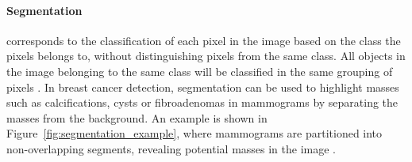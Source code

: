 \paragraph{Segmentation} corresponds to the classification of each pixel in the image based on the class the pixels belongs to, without distinguishing pixels from the same class. All objects in the image belonging to the same class will be classified in the same grouping of pixels \citep{Geron2019}. In breast cancer detection, segmentation can be used to highlight masses such as calcifications, cysts or fibroadenomas \citep{breastcancerorg2018} in mammograms by separating the masses from the background. An example is shown in Figure~\ref{fig:segmentation_example}, where mammograms are partitioned into non-overlapping segments, revealing potential masses in the image \citep{Punitha2018}.\\

